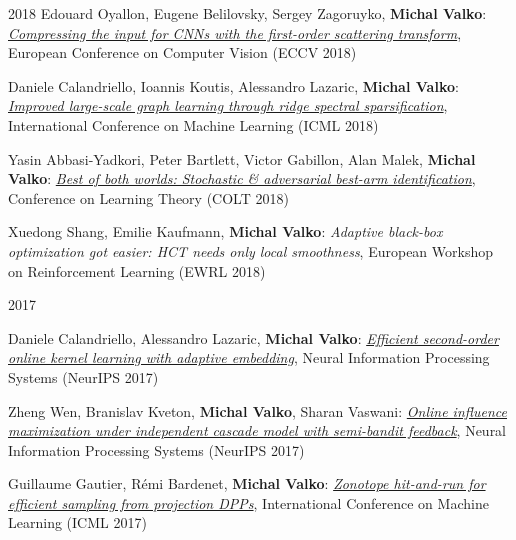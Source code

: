 \documentclass{resume}
\begin{document}
\begin{category}{2018}
\citembullet
Edouard Oyallon, Eugene Belilovsky, Sergey Zagoruyko, {\bf Michal Valko}:
\href{http://researchers.lille.inria.fr/~valko/hp/serve.php?what=publications/oyallon2018compressing.pdf}
{\emph{Compressing the input for CNNs with the first-order scattering transform}},
European Conference on Computer Vision
({\sf ECCV 2018}) 

\citembullet
Daniele Calandriello,  Ioannis Koutis,  Alessandro Lazaric, {\bf Michal Valko}:
\href{http://researchers.lille.inria.fr/~valko/hp/serve.php?what=publications/calandriello2018improved.pdf}
{\emph{Improved large-scale graph learning through ridge spectral sparsification}},
International Conference on Machine Learning
({\sf ICML 2018}) 

\citembullet
Yasin Abbasi-Yadkori, Peter Bartlett, Victor Gabillon, Alan Malek,  {\bf Michal Valko}:
\href{http://researchers.lille.inria.fr/~valko/hp/serve.php?what=publications/abbasi-yadkori2018best.pdf}
{\emph{Best of both worlds: Stochastic \& adversarial best-arm identification}},
Conference on Learning Theory
({\sf COLT 2018}) 

\citembullet
Xuedong Shang, Emilie Kaufmann, {\bf Michal Valko}:
\emph{Adaptive black-box optimization got easier: HCT needs only local smoothness},
European Workshop on Reinforcement Learning
({\sf EWRL 2018}) 

\end{category}\begin{category}{2017}

\citembullet
Daniele Calandriello, Alessandro Lazaric, {\bf Michal Valko}:
\href{http://researchers.lille.inria.fr/~valko/hp/serve.php?what=publications/calandriello2017efficient.pdf}
{\emph{Efficient second-order online kernel learning with adaptive embedding}},
Neural Information Processing Systems
({\sf NeurIPS 2017}) 


\citembullet
Zheng Wen, Branislav Kveton, {\bf Michal Valko}, Sharan Vaswani:
\href{http://researchers.lille.inria.fr/~valko/hp/serve.php?what=publications/wen2017online.pdf}
{\emph{Online influence maximization under independent cascade model with semi-bandit feedback}},
Neural Information Processing Systems
({\sf NeurIPS 2017})


\citembullet
Guillaume Gautier, R\' emi Bardenet, {\bf Michal Valko}:
\href{http://researchers.lille.inria.fr/~valko/hp/serve.php?what=publications/gautier2017zonotope.pdf}
{\emph{Zonotope hit-and-run for efficient sampling from projection DPPs}},
International Conference on Machine Learning
({\sf ICML 2017}) 


\end{category}
\end{document}
